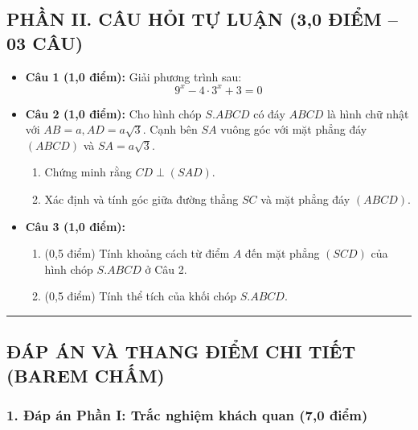 \documentclass[12pt, a4paper]{article}
\begin{document}
\subsection*{PHẦN II. CÂU HỎI TỰ LUẬN (3,0 ĐIỂM -- 03 CÂU)}

\begin{itemize}[leftmargin=0.6cm]
    \item \textbf{Câu 1 (1,0 điểm):} Giải phương trình sau:
    $$9^x - 4 \cdot 3^x + 3 = 0$$

    \item \textbf{Câu 2 (1,0 điểm):} Cho hình chóp $S.ABCD$ có đáy $ABCD$ là hình chữ nhật với $AB = a, AD = a\sqrt{3}$. Cạnh bên $SA$ vuông góc với mặt phẳng đáy $(ABCD)$ và $SA = a\sqrt{3}$.
    \begin{enumerate}[leftmargin=0.6cm]
        \item[a)] Chứng minh rằng $CD \perp (SAD)$.
        \item[b)] Xác định và tính góc giữa đường thẳng $SC$ và mặt phẳng đáy $(ABCD)$.
    \end{enumerate}

    \item \textbf{Câu 3 (1,0 điểm):} 
    \begin{enumerate}[leftmargin=0.6cm]
        \item[a)] (0,5 điểm) Tính khoảng cách từ điểm $A$ đến mặt phẳng $(SCD)$ của hình chóp $S.ABCD$ ở Câu 2.
        \item[b)] (0,5 điểm) Tính thể tích của khối chóp $S.ABCD$.
    \end{enumerate}
\end{itemize}

\vspace{10pt}
\hrule
\vspace{10pt}

\subsection*{ĐÁP ÁN VÀ THANG ĐIỂM CHI TIẾT (BAREM CHẤM)}

\subsubsection*{1. Đáp án Phần I: Trắc nghiệm khách quan (7,0 điểm)}
\end{document}
